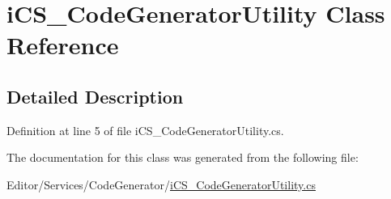 \hypertarget{classi_c_s___code_generator_utility}{\section{i\+C\+S\+\_\+\+Code\+Generator\+Utility Class Reference}
\label{classi_c_s___code_generator_utility}
}


\subsection{Detailed Description}


Definition at line 5 of file i\+C\+S\+\_\+\+Code\+Generator\+Utility.\+cs.



The documentation for this class was generated from the following file\+:\begin{DoxyCompactItemize}
\item 
Editor/\+Services/\+Code\+Generator/\hyperlink{i_c_s___code_generator_utility_8cs}{i\+C\+S\+\_\+\+Code\+Generator\+Utility.\+cs}\end{DoxyCompactItemize}
